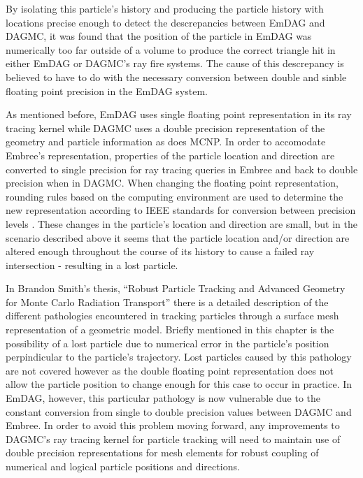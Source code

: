 \documentclass[12pt, a4paper]{article}
\begin{document}
By isolating this particle's history and producing the particle history with locations precise enough to detect the descrepancies between EmDAG and DAGMC, it was found that the position of the particle in EmDAG was numerically too far outside of a volume to produce the correct triangle hit in either EmDAG or DAGMC's ray fire systems. The cause of this descrepancy is believed to have to do with the necessary conversion between double and sinble floating point precision in the EmDAG system.

As mentioned before, EmDAG uses single floating point representation in its ray tracing kernel while DAGMC uses a double precision representation of the geometry and particle information as does MCNP. In order to accomodate Embree's representation, properties of the particle location and direction are converted to single precision for ray tracing queries in Embree and back to double precision when in DAGMC. When changing the floating point representation, rounding rules based on the computing environment are used to determine the new representation according to IEEE standards for conversion between precision levels \cite{IEEE_STD_2008}. These changes in the particle's location and direction are small, but in the scenario described above it seems that the particle location and/or direction are altered enough throughout the course of its history to cause a failed ray intersection - resulting in a lost particle.


In Brandon Smith's thesis, ``Robust Particle Tracking and Advanced Geometry for Monte Carlo Radiation Transport'' \cite{Smith_2011} there is a detailed description of the different pathologies encountered in tracking particles through a surface mesh representation of a geometric model. Briefly mentioned in this chapter is the possibility of a lost particle due to numerical error in the particle's position perpindicular to the particle's trajectory. Lost particles caused by this pathology are not covered however as the double floating point representation does not allow the particle position to change enough for this case to occur in practice. In EmDAG, however, this particular pathology is now vulnerable due to the constant conversion from single to double precision values between DAGMC and Embree. In order to avoid this problem moving forward, any improvements to DAGMC's ray tracing kernel for particle tracking will need to maintain use of double precision representations for mesh elements for robust coupling of numerical and logical particle positions and directions.
\end{document}
